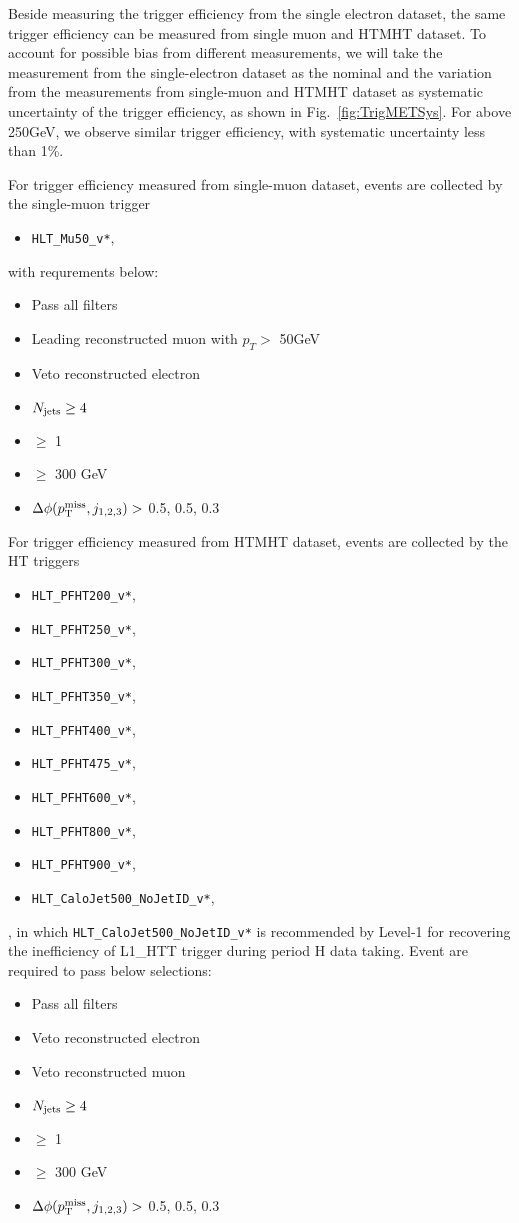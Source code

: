 Beside measuring the \MET trigger efficiency from the single electron dataset,
the same trigger efficiency can be measured from single muon and HTMHT
dataset. To account for possible bias from different measurements, we will
take the measurement from the single-electron dataset as the nominal and the
variation from the measurements from single-muon and HTMHT dataset as
systematic uncertainty of the trigger efficiency, as shown in
Fig.~\ref{fig:TrigMETSys}. For \MET above 250GeV, we observe similar \MET
trigger efficiency, with systematic uncertainty less than 1\%.

For \MET trigger efficiency measured from single-muon dataset, events are collected by the single-muon trigger
\begin{itemize}
  \item \texttt{HLT\_Mu50\_v*},
\end{itemize}
with requrements below:
\begin{itemize}
  \item Pass all filters
	\item Leading reconstructed muon with $p_{T}>$ 50GeV
  \item Veto reconstructed electron
  \item $N_{\text{jets}}\geq4$
  \item \nbjets $\ge$ 1
  \item \HT $\ge$ 300 GeV
  \item $\Delta\phi(p^{\rm miss}_{\rm T}, j_{1,2,3})>$ 0.5, 0.5, 0.3
\end{itemize}
For \MET trigger efficiency measured from HTMHT dataset, events are
collected by the HT triggers
\begin{itemize}
  \item \texttt{HLT\_PFHT200\_v*},
  \item \texttt{HLT\_PFHT250\_v*},
  \item \texttt{HLT\_PFHT300\_v*},
  \item \texttt{HLT\_PFHT350\_v*},
  \item \texttt{HLT\_PFHT400\_v*},
  \item \texttt{HLT\_PFHT475\_v*},
  \item \texttt{HLT\_PFHT600\_v*},
  \item \texttt{HLT\_PFHT800\_v*},
  \item \texttt{HLT\_PFHT900\_v*},
  \item \texttt{HLT\_CaloJet500\_NoJetID\_v*},
\end{itemize}, 
in which \texttt{HLT\_CaloJet500\_NoJetID\_v*} is recommended by Level-1 for
recovering the inefficiency of L1\_HTT trigger during period H data taking.
Event are required to pass below selections:
\begin{itemize}
  \item Pass all filters
  \item Veto reconstructed electron
  \item Veto reconstructed muon
  \item $N_{\text{jets}}\geq4$
  \item \nbjets $\ge$ 1
  \item \HT $\ge$ 300 GeV
  \item $\Delta\phi(p^{\rm miss}_{\rm T}, j_{1,2,3})>$ 0.5, 0.5, 0.3
\end{itemize}

